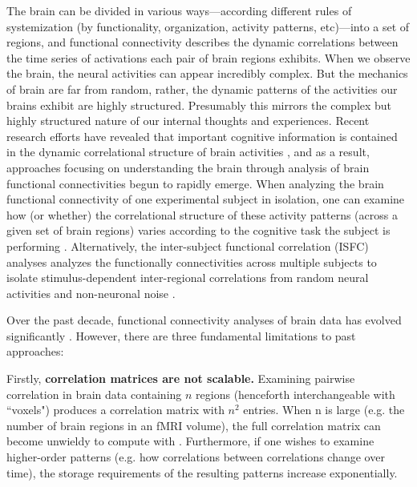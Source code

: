 \documentclass[11pt]{article}
\begin{document}
The brain can be divided in various ways---according different rules of systemization (by functionality, organization, activity patterns, etc)---into a set of regions, and functional connectivity describes the dynamic correlations between the time series of activations each pair of brain regions exhibits. When we observe the brain, the neural activities can appear incredibly complex. But the mechanics of brain are far from random, rather, the dynamic patterns of the activities our brains exhibit are highly structured. Presumably this mirrors the complex but highly structured nature of our internal thoughts and experiences. Recent research efforts have revealed that important cognitive information is contained in the dynamic correlational structure of brain activities \cite{davidson2016}, and as a result, approaches focusing on understanding the brain through analysis of brain functional connectivities begun to rapidly emerge. When analyzing the brain functional connectivity of one experimental subject in isolation, one can examine how (or whether) the correlational structure of these activity patterns (across a given set of brain regions) varies according to the cognitive task the subject is performing \cite{Turke13}\cite{Rubinov2010}\cite{peterson10}. Alternatively, the inter-subject functional correlation (ISFC) analyses analyzes the functionally connectivities across multiple subjects to isolate stimulus-dependent inter-regional correlations from random neural activities and non-neuronal noise \cite{hasson2016}\cite{jeremy2017}.

Over the past decade, functional connectivity analyses of brain data has evolved significantly \cite{olaf2005}\cite{khambhati2017}. However, there are three fundamental limitations to past approaches:

Firstly, \textbf{correlation matrices are not scalable.} Examining pairwise correlation in brain data containing $n$ regions (henceforth interchangeable with ``voxels") produces a correlation matrix with $n^2$ entries. When n is large (e.g. the number of brain regions in an fMRI volume), the full correlation matrix can become unwieldy to compute with \cite{Rubinov2010}\cite{Betzel2017}\cite{Craddock2012}\cite{Yeo2011}. Furthermore, if one wishes to examine higher-order patterns (e.g. how correlations between correlations change over time), the storage requirements of the resulting patterns increase exponentially.
\end{document}
